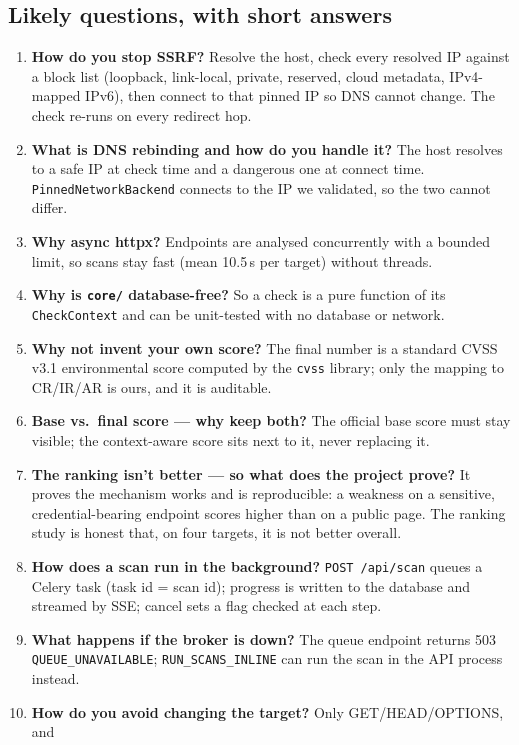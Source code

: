 \subsection{Likely questions, with short answers}
\begin{enumerate}[leftmargin=*,itemsep=3pt]
\item \textbf{How do you stop SSRF?} Resolve the host, check every resolved IP
against a block list (loopback, link-local, private, reserved, cloud metadata,
IPv4-mapped IPv6), then connect to that pinned IP so DNS cannot change. The check
re-runs on every redirect hop.
\item \textbf{What is DNS rebinding and how do you handle it?} The host resolves
to a safe IP at check time and a dangerous one at connect time.
\texttt{PinnedNetworkBackend} connects to the IP we validated, so the two cannot
differ.
\item \textbf{Why async httpx?} Endpoints are analysed concurrently with a
bounded limit, so scans stay fast (mean 10.5\,s per target) without threads.
\item \textbf{Why is \texttt{core/} database-free?} So a check is a pure function
of its \texttt{CheckContext} and can be unit-tested with no database or network.
\item \textbf{Why not invent your own score?} The final number is a standard CVSS
v3.1 environmental score computed by the \texttt{cvss} library; only the mapping
to CR/IR/AR is ours, and it is auditable.
\item \textbf{Base vs.\ final score --- why keep both?} The official base score
must stay visible; the context-aware score sits next to it, never replacing it.
\item \textbf{The ranking isn't better --- so what does the project prove?} It
proves the mechanism works and is reproducible: a weakness on a sensitive,
credential-bearing endpoint scores higher than on a public page. The ranking
study is honest that, on four targets, it is not better overall.
\item \textbf{How does a scan run in the background?} \texttt{POST /api/scan}
queues a Celery task (task id = scan id); progress is written to the database and
streamed by SSE; cancel sets a flag checked at each step.
\item \textbf{What happens if the broker is down?} The queue endpoint returns 503
\texttt{QUEUE\_UNAVAILABLE}; \texttt{RUN\_SCANS\_INLINE} can run the scan in the
API process instead.
\item \textbf{How do you avoid changing the target?} Only GET/HEAD/OPTIONS, and

\end{enumerate}
